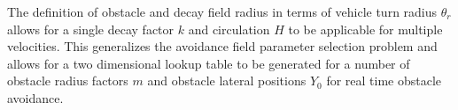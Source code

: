 \documentclass[conf]{new-aiaa}
\begin{document}
The definition of obstacle and decay field radius in terms of vehicle turn radius $\theta_r$ allows for a single decay factor $k$ and circulation $H$ to be applicable for multiple velocities. This generalizes the avoidance field parameter selection problem and allows for a two dimensional lookup table to be generated for a number of obstacle radius factors $m$ and obstacle lateral positions $Y_0$ for real time obstacle avoidance. \\



%
%
%
%
%
%
\end{document}
